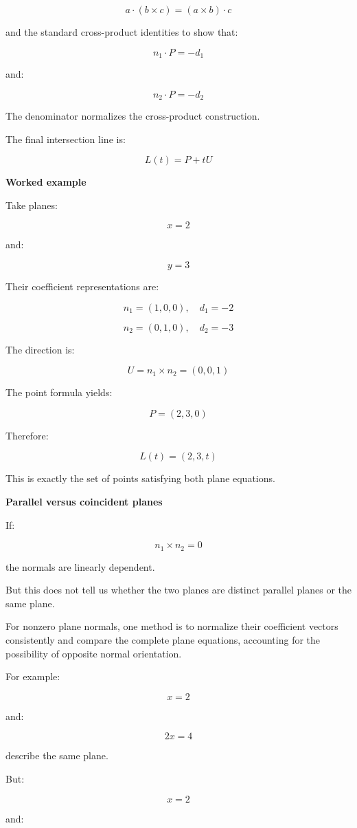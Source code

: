 \[
a\cdot(b\times c)=(a\times b)\cdot c
\]

and the standard cross-product identities to show that:

\[
n_1\cdot P=-d_1
\]

and:

\[
n_2\cdot P=-d_2
\]

The denominator normalizes the cross-product construction.

The final intersection line is:

\[
\boxed{ L(t)=P+tU }
\]

\textbf{Worked example}

Take planes:

\[
x=2
\]

and:

\[
y=3
\]

Their coefficient representations are:

\[
n_1=(1,0,0),\quad d_1=-2
\]

\[
n_2=(0,1,0),\quad d_2=-3
\]

The direction is:

\[
U=n_1\times n_2=(0,0,1)
\]

The point formula yields:

\[
P=(2,3,0)
\]

Therefore:

\[
\boxed{ L(t)=(2,3,t) }
\]

This is exactly the set of points satisfying both plane equations.

\textbf{Parallel versus coincident planes}

If:

\[
n_1\times n_2=0
\]

the normals are linearly dependent.

But this does not tell us whether the two planes are distinct parallel planes or the same plane.

For nonzero plane normals, one method is to normalize their coefficient vectors consistently and compare the complete plane equations, accounting for the possibility of opposite normal orientation.

For example:

\[
x=2
\]

and:

\[
2x=4
\]

describe the same plane.

But:

\[
x=2
\]

and:

